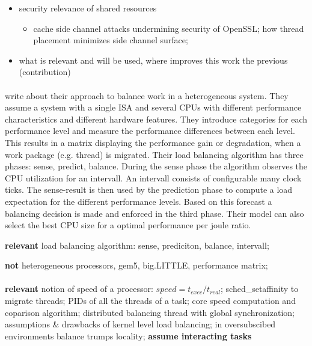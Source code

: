 \begin{itemize}
  \item security relevance of shared resources
    \begin{itemize}
  \item cache side channel attacks undermining security of OpenSSL; how thread
    placement minimizes side channel surface;
    \end{itemize}

  \item what is relevant and will be used, where improves this work the
    previous (contribution)
  \end{itemize}

\paragraph{ \cite{sarma_smartbalance_2015} }
\citeauthor{sarma_smartbalance_2015} write about their approach to balance work
in a heterogeneous system.
They assume a system with a single ISA and several CPUs with different performance
characteristics and different hardware features.
They introduce categories for each performance level and measure the
performance differences between each level.
This results in a matrix displaying the performance gain or degradation, when
a work package (e.g. thread) is migrated.
Their load balancing algorithm has three phases: sense, predict, balance.
During the sense phase the algorithm observes the CPU utilization for an intervall.
An intervall consists of configurable many clock ticks.
The sense-result is then used by the prediction phase to compute a load
expectation for the different performance levels.
Based on this forecast a balancing decision is made and enforced in the third
phase.
Their model can also select the best CPU size for a optimal performance per
joule ratio.

\textbf{relevant} load balancing algorithm: sense, prediciton, balance,
intervall;

\textbf{not} heterogeneous processors, gem5, big.LITTLE, performance
matrix;

\paragraph{ \cite{hofmeyr_load_2010} }

\textbf{relevant} notion of speed of a processor: $speed = t_{exec}/t_{real}$;
sched\_setaffinity to migrate threads; PIDs of all the threads of a task;
core speed computation and coparison algorithm;
distributed balancing thread with global synchronization;
assumptions \& drawbacks of kernel level load balancing;
in oversubscibed environments balance trumps locality;
\textbf{assume interacting tasks}


